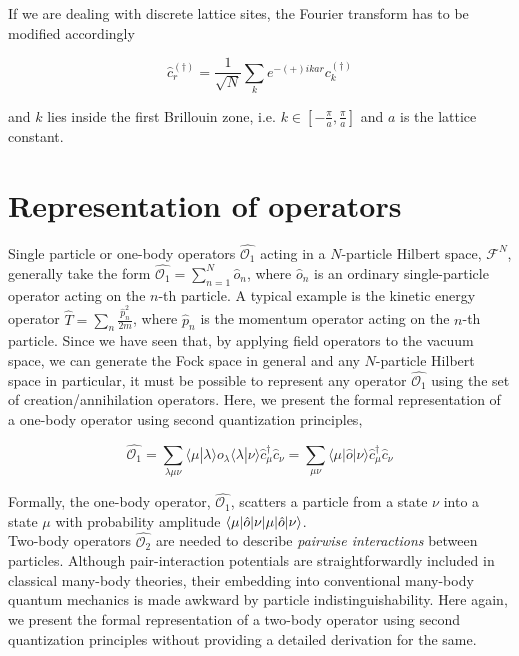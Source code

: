 If we are dealing with discrete lattice sites, the Fourier transform has to be modified accordingly

\begin{equation}
    \hat{c}_{r}^{(\dagger)} = \frac{1}{\sqrt{N}} \sum_{k}e^{-(+)ikar}c_{k}^{(\dagger)}
\end{equation}

and $k$ lies inside the first Brillouin zone, i.e. $k \in \left[-\frac{\pi}{a},\frac{\pi}{a}\right]$ and $a$ is the lattice constant.

\section{Representation of operators}

Single particle or one-body operators $\hat{\mathcal{O}_{1}}$ acting in a $N$-particle Hilbert space, $\mathcal{F}^{N}$, generally take the form $\hat{\mathcal{O}_{1}} = \sum_{n = 1}^{N}\hat{o}_{n}$, where $\hat{o}_{n}$ is an ordinary single-particle operator acting on the $n$-th particle. A typical example is the kinetic energy operator $\hat{T} = \sum_{n}\frac{\hat{p}_{n}^{2}}{2m}$, where $\hat{p}_{n}$ is the momentum operator acting on the $n$-th particle. Since we have seen that, by applying field operators to the vacuum space, we can generate the Fock space in general and any $N$-particle Hilbert space in particular, it must be possible to represent any operator $\hat{\mathcal{O}_{1}}$ using the set of creation/annihilation operators. Here, we present the formal representation of a one-body operator using second quantization principles,

\begin{equation}
    \hat{\mathcal{O}_{1}} = \sum_{\lambda \mu \nu}\langle \mu | \lambda \rangle o_{\lambda}\langle \lambda | \nu \rangle \hat{c}^{\dagger}_{\mu} \hat{c}_{\nu} = \sum_{\mu \nu}\langle \mu|\hat{o}|\nu \rangle \hat{c}^{\dagger}_{\mu} \hat{c}_{\nu}
\end{equation}

Formally, the one-body operator, $\hat{\mathcal{O}_{1}}$, scatters a particle from a state $\nu$ into a state $\mu$ with probability amplitude $\braket{\mu|\hat{o}|\nu}$. \\

Two-body operators $\hat{\mathcal{O}_{2}}$ are needed to describe \textit{pairwise interactions} between particles. Although pair-interaction potentials are straightforwardly included in classical many-body theories, their embedding into conventional many-body quantum mechanics is made awkward by particle indistinguishability. Here again, we present the formal representation of a two-body operator using second quantization principles without providing a detailed derivation for the same.

